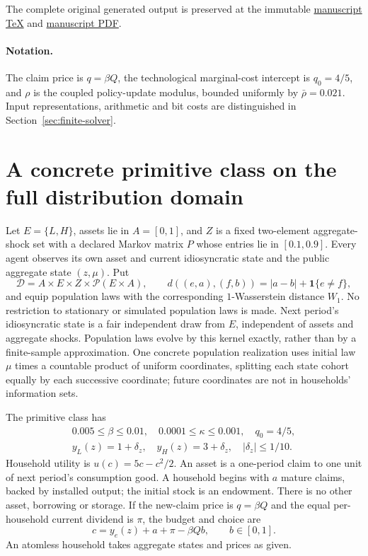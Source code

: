 \documentclass[11pt,a4paper]{article}
\begin{document}
The complete original generated output is preserved at the immutable
\href{https://github.com/jbaelaw/certified-heterogeneous-agent-computation/blob/629e26c2cc4fce0c729a0545c296e537fcd38491/paper/Proof.tex}{manuscript TeX}
and \href{https://github.com/jbaelaw/certified-heterogeneous-agent-computation/blob/629e26c2cc4fce0c729a0545c296e537fcd38491/paper/Proof.pdf}{manuscript PDF}.

\paragraph{Notation.}
The claim price is $q=\beta Q$, the technological marginal-cost intercept is
$q_0=4/5$, and $\rho$ is the coupled policy-update modulus, bounded uniformly
by $\bar\rho=0.021$. Input representations, arithmetic and bit costs
are distinguished in Section~\ref{sec:finite-solver}.

\section{A concrete primitive class on the full distribution domain}
\label{sec:economy}

Let $E=\{L,H\}$, assets lie in $A=[0,1]$, and $Z$ is a fixed two-element
aggregate-shock set with a declared Markov matrix $P$ whose entries lie
in $[0.1,0.9]$. Every agent
observes its own asset and current idiosyncratic state and the public
aggregate state $(z,\mu)$. Put
\[
 \mathcal D=A\times E\times Z\times\mathcal P(E\times A),\qquad
 d((e,a),(f,b))=|a-b|+\mathbf1\{e\ne f\},
 \tag{EC1}
\]
and equip population laws with the corresponding $1$-Wasserstein distance
$W_1$. No restriction to stationary or simulated population laws is made.
Next period's idiosyncratic state is a fair independent draw from $E$,
independent of assets and aggregate shocks. Population laws evolve by this
kernel exactly, rather than by a finite-sample approximation. One concrete
population realization uses initial law $\mu$ times a countable product of
uniform coordinates, splitting each state cohort equally by each successive
coordinate; future coordinates are not in households' information sets.

The primitive class has
\[
\begin{gathered}
 0.005\leq\beta\leq0.01,\quad 0.0001\leq\kappa\leq0.001,\quad q_0=4/5,\\
 y_L(z)=1+\delta_z,\quad y_H(z)=3+\delta_z,\quad |\delta_z|\leq1/10.
\end{gathered}
 \tag{EC2}
\]
Household utility is $u(c)=5c-c^2/2$. An asset is a one-period claim to one
unit of next period's consumption good. A household begins with $a$ mature
claims, backed by installed output; the initial stock is an endowment.
There is no other asset, borrowing or storage. If the new-claim price is
$q=\beta Q$ and the equal per-household current dividend is $\pi$, the
budget and choice are
\[
 c=y_e(z)+a+\pi-\beta Qb,\qquad b\in[0,1].
 \tag{EC3}
\]
An atomless household takes aggregate states and prices as given.
\end{document}
